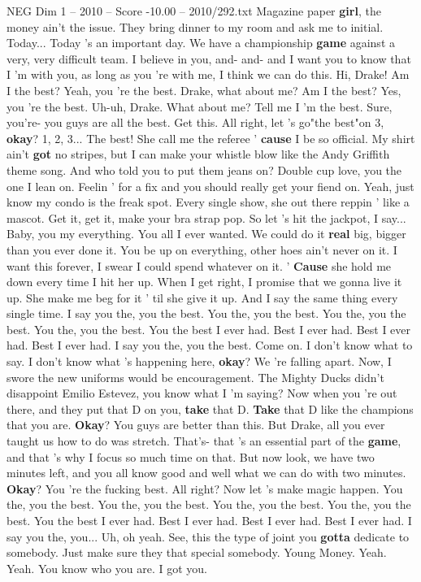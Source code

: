 \begin{textsample}{NEG Dim 1 – 2010 – Score -10.00 – 2010/292.txt}
Magazine paper \textbf{girl}, the money ain't the issue.
They bring dinner to my room and ask me to initial.
Today...
Today 's an important day.
We have a championship \textbf{game} against a very, very difficult team.
I believe in you, and- and- and I want you to know that I 'm with you, as long as you 're with me, I think we can do this.
Hi, Drake!
Am I the best?
Yeah, you 're the best.
Drake, what about me?
Am I the best?
Yes, you 're the best.
Uh-uh, Drake.
What about me?
Tell me I 'm the best.
Sure, you're- you guys are all the best.
Get this.
All right, let 's go"the best"on 3, \textbf{okay}? 1, 2, 3...
The best!
She call me the referee ' \textbf{cause} I be so official.
My shirt ain't \textbf{got} no stripes, but I can make your whistle blow like the Andy Griffith theme song.
And who told you to put them jeans on?
Double cup love, you the one I lean on.
Feelin ' for a fix and you should really get your fiend on.
Yeah, just know my condo is the freak spot.
Every single show, she out there reppin ' like a mascot.
Get it, get it, make your bra strap pop.
So let 's hit the jackpot, I say...
Baby, you my everything.
You all I ever wanted.
We could do it \textbf{real} big, bigger than you ever done it.
You be up on everything, other hoes ain't never on it.
I want this forever, I swear I could spend whatever on it. ' \textbf{Cause} she hold me down every time I hit her up.
When I get right, I promise that we gonna live it up.
She make me beg for it ' til she give it up.
And I say the same thing every single time.
I say you the, you the best.
You the, you the best.
You the, you the best.
You the, you the best.
You the best I ever had.
Best I ever had.
Best I ever had.
Best I ever had.
I say you the, you the best.
Come on.
I don't know what to say.
I don't know what 's happening here, \textbf{okay}?
We 're falling apart.
Now, I swore the new uniforms would be encouragement.
The Mighty Ducks didn't disappoint Emilio Estevez, you know what I 'm saying?
Now when you 're out there, and they put that D on you, \textbf{take} that D. \textbf{Take} that D like the champions that you are. \textbf{Okay}?
You guys are better than this.
But Drake, all you ever taught us how to do was stretch.
That's- that 's an essential part of the \textbf{game}, and that 's why I focus so much time on that.
But now look, we have two minutes left, and you all know good and well what we can do with two minutes. \textbf{Okay}?
You 're the fucking best.
All right?
Now let 's make magic happen.
You the, you the best.
You the, you the best.
You the, you the best.
You the, you the best.
You the best I ever had.
Best I ever had.
Best I ever had.
Best I ever had.
I say you the, you...
Uh, oh yeah.
See, this the type of joint you \textbf{gotta} dedicate to somebody.
Just make sure they that special somebody.
Young Money.
Yeah.
Yeah.
You know who you are.
I got you.

\end{textsample}
